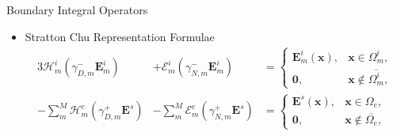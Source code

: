 \documentclass[12pt]{beamer}
\begin{document}
\begin{frame}{Boundary Integral Operators}
\begin{footnotesize}
\begin{itemize}
    \item Stratton Chu Representation Formulae
        \begin{alignat}{3}
            \mathcal{H}^i_m (\gamma_{D,m}^- \mathbf{E}^i_m) &+ \mathcal{E}^i_m (\gamma_{N,m}^- \mathbf{E}^i_m) &= 
            \begin{cases}
                \mathbf{E}^i_m(\mathbf{x}), & \mathbf{x} \in \Omega^i_m, \\
                \mathbf{0}, & \mathbf{x} \not \in \overline{\Omega^i_m},
            \end{cases} \nonumber\\
            -\sum_m^M \mathcal{H}^e_m (\gamma_{D,m}^+ \mathbf{E}^s) &- \sum_m^M  \mathcal{E}^e_m (\gamma_{N,m}^+ \mathbf{E}^s) &= 
            \begin{cases}
                \mathbf{E}^s(\mathbf{x}), & \mathbf{x} \in \Omega_e, \\
                \mathbf{0}, & \mathbf{x} \not \in \overline{\Omega_e},
            \end{cases} \nonumber 
        \end{alignat}
\end{itemize}
\end{footnotesize}    
\end{frame}
\end{document}
